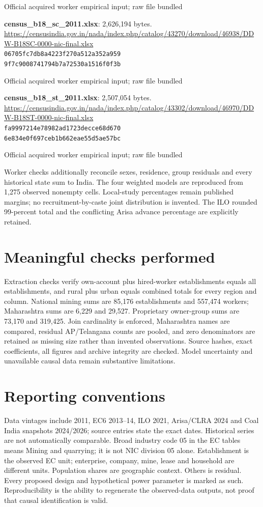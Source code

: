 \documentclass[11pt,a4paper]{report}
\begin{document}
Official acquired worker empirical input; raw file bundled

\textbf{census\_b18\_sc\_2011.xlsx}: 2,626,194 bytes. \url{https://censusindia.gov.in/nada/index.php/catalog/43270/download/46938/DDW-B18SC-0000-nic-final.xlsx}\\
\texttt{06705fc7db8a4223f270a512a352a959}\\\texttt{9f7c9008741794b7a72530a1516f0f3b}

Official acquired worker empirical input; raw file bundled

\textbf{census\_b18\_st\_2011.xlsx}: 2,507,054 bytes. \url{https://censusindia.gov.in/nada/index.php/catalog/43302/download/46970/DDW-B18ST-0000-nic-final.xlsx}\\
\texttt{fa9997214e78982ad1723decce68d670}\\\texttt{6e834e0f697ceb1b662eae55d5ae57bc}

Official acquired worker empirical input; raw file bundled

Worker checks additionally reconcile sexes, residence, group residuals and every historical state sum to India. The four weighted models are reproduced from 1,275 observed nonempty cells. Local-study percentages remain published margins; no recruitment-by-caste joint distribution is invented. The ILO rounded 99-percent total and the conflicting Arisa advance percentage are explicitly retained.
\section{Meaningful checks performed}
Extraction checks verify own-account plus hired-worker establishments equals all establishments, and rural plus urban equals combined totals for every region and column. National mining sums are 85,176 establishments and 557,474 workers; Maharashtra sums are 6,229 and 29,527. Proprietary owner-group sums are 73,170 and 319,425. Join cardinality is enforced, Maharashtra names are compared, residual AP/Telangana counts are pooled, and zero denominators are retained as missing size rather than invented observations. Source hashes, exact coefficients, all figures and archive integrity are checked. Model uncertainty and unavailable causal data remain substantive limitations.
\section{Reporting conventions}
Data vintages include 2011, EC6 2013--14, ILO 2021, Arisa/CLRA 2024 and Coal India snapshots 2024/2026; source entries state the exact dates. Historical series are not automatically comparable.  Broad industry code 05 in the EC tables means Mining and quarrying; it is not NIC division 05 alone. Establishment is the observed EC unit; enterprise, company, mine, lease and household are different units. Population shares are geographic context. Others is residual. Every proposed design and hypothetical power parameter is marked as such. Reproducibility is the ability to regenerate the observed-data outputs, not proof that causal identification is valid.
\end{document}
